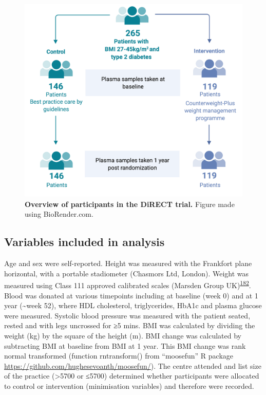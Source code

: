 \documentclass[11pt,twoside]{bristolthesis}
\begin{document}
\begin{figure}
\includegraphics{figure/DiRECT/DiRECT_study_summary} \caption[Overview of participants in the DiRECT trial]{\textbf{Overview of participants in the DiRECT trial.} Figure made using BioRender.com.}\label{fig:direct-participants}
\end{figure}
\hypertarget{variables-included-in-analysis}{%
\subsection{Variables included in analysis}\label{variables-included-in-analysis}}

Age and sex were self-reported. Height was measured with the Frankfort plane horizontal, with a portable stadiometer (Chasmors Ltd, London). Weight was measured using Class 111 approved calibrated scales (Marsden Group UK)\textsuperscript{\protect\hyperlink{ref-Leslie2016}{182}}. Blood was donated at various timepoints including at baseline (week 0) and at 1 year (\textasciitilde week 52), where HDL cholesterol, triglycerides, HbA1c and plasma glucose were measured. Systolic blood pressure was measured with the patient seated, rested and with legs uncrossed for ≥5 mins. BMI was calculated by dividing the weight (kg) by the square of the height (m). BMI change was calculated by subtracting BMI at baseline from BMI at 1 year. This BMI change was rank normal transformed (function rntransform() from ``moosefun'' R package \url{https://github.com/hughesevoanth/moosefun/}). The centre attended and list size of the practice (\textgreater5700 or ≤5700) determined whether participants were allocated to control or intervention (minimisation variables) and therefore were recorded.
\end{document}
